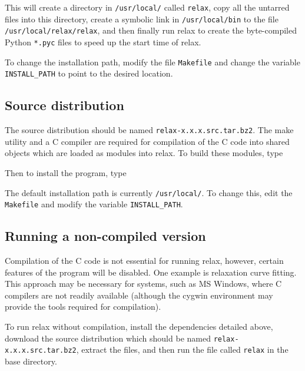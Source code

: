 
This will create a directory in \texttt{/usr/local/} called \texttt{relax}, copy all the untarred files into this directory, create a symbolic link in \texttt{/usr/local/bin} to the file \texttt{/usr/local/relax/relax}, and then finally run relax to create the byte-compiled Python \texttt{*.pyc} files to speed up the start time of relax.

To change the installation path, modify the file \texttt{Makefile} and change the variable \texttt{INSTALL\_PATH} to point to the desired location.


\subsection{Source distribution}

The source distribution should be named \texttt{relax-x.x.x.src.tar.bz2}.  The make utility and a C compiler are required for compilation of the C code into shared objects which are loaded as modules into relax.  To build these modules, type


Then to install the program, type


The default installation path is currently \texttt{/usr/local/}.  To change this, edit the \texttt{Makefile} and modify the variable \texttt{INSTALL\_PATH}.


\subsection{Running a non-compiled version}

Compilation of the C code is not essential for running relax, however, certain features of the program will be disabled.  One example is relaxation curve fitting.  This approach may be necessary for systems, such as MS Windows, where C compilers are not readily available (although the cygwin environment may provide the tools required for compilation).

To run relax without compilation, install the dependencies detailed above, download the source distribution which should be named \texttt{relax-x.x.x.src.tar.bz2}, extract the files, and then run the file called \texttt{relax} in the base directory.



